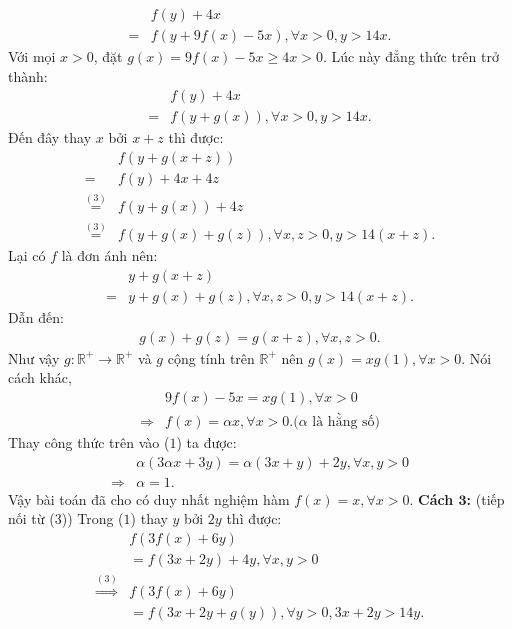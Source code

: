 \begin{multicols}{2}
	\begin{align*}
		&f(y) + 4x \\
		= &f(y + 9f(x) - 5x),\forall x > 0,y > 14x.
	\end{align*}
	Với mọi  $x > 0$, đặt  $g(x) = 9f(x) - 5x \ge 4x > 0.$ Lúc này đẳng thức trên trở thành: 
	\begin{align*}
		&f(y) + 4x \\
		= &f(y + g(x)),\forall x > 0,y > 14x. \tag{$3$}
	\end{align*}
	Đến đây thay $x$  bởi $x + z$  thì được: 
	\begin{align*}
		&f(y + g(x + z)) \\
		= &f(y) + 4x + 4z\\
		\mathop  = \limits^{(3)} &f(y + g(x)) + 4z\\
		\mathop  = \limits^{(3)} &f(y \!+\! g(x) \!+\! g(z)),\forall x,z > 0,y > 14(x \!+\! z).
	\end{align*}
	Lại có $f$ là đơn ánh nên: 
	\begin{align*}
		&y + g(x + z) \\
		= &y + g(x) + g(z),\forall x,z > 0,y > 14(x + z).
	\end{align*}
	Dẫn đến: 
	\begin{align*}
		g(x) + g(z) = g(x + z),\forall x,z > 0.
	\end{align*}
	Như vậy $g: \mathbb{R^+} \to \mathbb{R^+}$  và $g$ cộng tính trên $\mathbb{R^+}$  nên $g(x) = xg(1),\forall x > 0.$  Nói cách khác, 
	\begin{align*}
		&9f(x) - 5x = xg(1),\forall x > 0\\
		\Rightarrow &f(x) = \alpha x,\forall x > 0. \text{($\alpha$ là hằng số)}
	\end{align*}
	Thay công thức trên vào ($1$) ta được: 
	\begin{align*}
		&\alpha (3\alpha x + 3y) = \alpha (3x + y) + 2y,\forall x,y > 0\\
		\Rightarrow &\alpha = 1.
	\end{align*}
	Vậy bài toán đã cho có duy nhất nghiệm hàm  $f(x)= x, \forall x > 0$.
	\vskip 0.1cm
	\textbf{\color{hoccungpi}Cách $\pmb3$:} (tiếp nối từ ($3$))
	\vskip 0.1cm 
	Trong ($1$) thay $y$ bởi $2y$ thì được: 
	\begin{align*}
		&f(3f(x) + 6y) \\
		&= f(3x + 2y) + 4y,\forall x,y > 0\\
		\mathop  \Rightarrow \limits^{(3)} &f(3f(x) + 6y) \\
		&= f(3x \!+\! 2y \!+\! g(y)),\forall y \!>\! 0,3x \!+\! 2y \!>\! 14y.

\end{align*}
\end{multicols}
